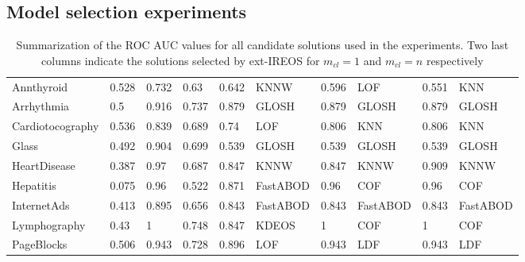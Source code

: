 \documentclass[11pt]{article}
\begin{document}
{\newpage
\subsection{Model selection experiments}\label{sec:model}

\begin{table}[h!]
\footnotesize
\centering
\captionsetup{justification=centering}
\caption{Summarization of the ROC AUC values for all candidate solutions used in the experiments. Two last columns indicate the solutions selected by ext-IREOS for $m_{cl} = 1$ and $m_{cl} = n$ respectively}
\label{tab:model_selection}
\begin{tabular}{@{}llllllllll@{}}
\toprule
\multicolumn{1}{l|}{Annthyroid} & 0.528 & 0.732 & \multicolumn{1}{l|}{0.63} & 0.642 & \multicolumn{1}{l|}{KNNW} & 0.596 & \multicolumn{1}{l|}{LOF} & 0.551 & \multicolumn{1}{l|}{KNN}  \\ 
\multicolumn{1}{l|}{Arrhythmia} & 0.5 & 0.916 & \multicolumn{1}{l|}{0.737} & 0.879 & \multicolumn{1}{l|}{GLOSH} & 0.879 & \multicolumn{1}{l|}{GLOSH} & 0.879 & \multicolumn{1}{l|}{GLOSH}  \\ 
\multicolumn{1}{l|}{Cardiotocography} & 0.536 & 0.839 & \multicolumn{1}{l|}{0.689} & 0.74 & \multicolumn{1}{l|}{LOF} & 0.806 & \multicolumn{1}{l|}{KNN} & 0.806 & \multicolumn{1}{l|}{KNN}  \\ 
\multicolumn{1}{l|}{Glass} & 0.492 & 0.904 & \multicolumn{1}{l|}{0.699} & 0.539 & \multicolumn{1}{l|}{GLOSH} & 0.539 & \multicolumn{1}{l|}{GLOSH} & 0.539 & \multicolumn{1}{l|}{GLOSH}  \\ 
\multicolumn{1}{l|}{HeartDisease} & 0.387 & 0.97 & \multicolumn{1}{l|}{0.687} & 0.847 & \multicolumn{1}{l|}{KNNW} & 0.847 & \multicolumn{1}{l|}{KNNW} & 0.909 & \multicolumn{1}{l|}{KNNW}  \\ 
\multicolumn{1}{l|}{Hepatitis} & 0.075 & 0.96 & \multicolumn{1}{l|}{0.522} & 0.871 & \multicolumn{1}{l|}{FastABOD} & 0.96 & \multicolumn{1}{l|}{COF} & 0.96 & \multicolumn{1}{l|}{COF}  \\ 
\multicolumn{1}{l|}{InternetAds} & 0.413 & 0.895 & \multicolumn{1}{l|}{0.656} & 0.843 & \multicolumn{1}{l|}{FastABOD} & 0.843 & \multicolumn{1}{l|}{FastABOD} & 0.843 & \multicolumn{1}{l|}{FastABOD}  \\ 
\multicolumn{1}{l|}{Lymphography} & 0.43 & 1 & \multicolumn{1}{l|}{0.748} & 0.847 & \multicolumn{1}{l|}{KDEOS} & 1 & \multicolumn{1}{l|}{COF} & 1 & \multicolumn{1}{l|}{COF}  \\ 
\multicolumn{1}{l|}{PageBlocks} & 0.506 & 0.943 & \multicolumn{1}{l|}{0.728} & 0.896 & \multicolumn{1}{l|}{LOF} & 0.943 & \multicolumn{1}{l|}{LDF} & 0.943 & \multicolumn{1}{l|}{LDF}  \\ 

\end{tabular}
\end{table}}
\end{document}
